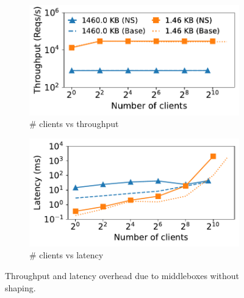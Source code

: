 \begin{figure}[t]
    \centering
    \begin{subfigure}{0.49\columnwidth}
    \centering
    \includegraphics[width=\textwidth]{throughput_vs_client_num.pdf}
    \caption{\# clients vs throughput}
    \label{subfig:clients-vs-xput}
    \end{subfigure}
    \hfill
    \begin{subfigure}{0.49\columnwidth}
    \centering
    \includegraphics[width=\textwidth]{latencies_vs_client_num-logscale.pdf}
    \caption{\# clients vs latency}
    \label{subfig:clients-vs-latency}
    \end{subfigure}
    \caption{Throughput and latency overhead due to middleboxes without shaping.
    }
    \vspace{-0.4cm}
    \label{fig:xput-latency-microbench}
\end{figure}

